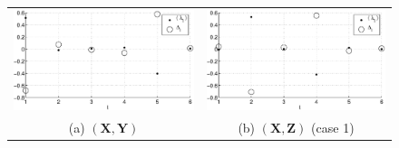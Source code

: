 \begin{figure}[ht]
\begin{center}
\begin{tabular}{cc}
\includegraphics[scale=0.48]{NoisyMultiResponseExample_LandLCC_XY.eps} & \includegraphics[scale=0.48]{NoisyMultiResponseExample_LandLCC_XZ1.eps} \\
(a) $(\mathbf{X},\mathbf{Y})$ & (b) $(\mathbf{X},\mathbf{Z})$ (case 1)\\

\end{tabular}
\end{center}
\end{figure}
